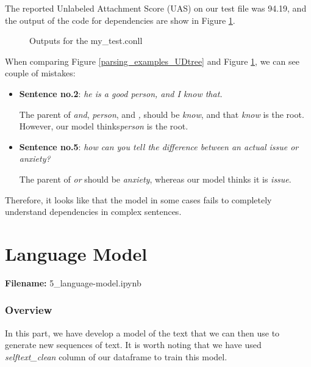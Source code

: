 \documentclass[12pt, a4paper]{article}
\begin{document}
The reported Unlabeled Attachment Score (UAS) on our test file was 94.19, and the output of the code for dependencies are show in Figure \ref{parsing_output}. 
\begin{figure}[H]
	\caption{Outputs for the my\_test.conll}
	\label{parsing_output}
\end{figure}

When comparing Figure \ref{parsing_examples_UDtree} and Figure \ref{parsing_output}, we can see couple of mistakes:
\begin{itemize}
	\item \textbf{Sentence no.2}: \emph{he is a good person, and I know that.}
	
	The parent of \emph{and}, \emph{person}, and \emph{,} should be \emph{know}, and that \emph{know} is the root. However, our model thinks\emph{person} is the root.
	
	\item \textbf{Sentence no.5}:
	 \emph{how can you tell the difference between an actual issue or anxiety?}
	 
	 The parent of \emph{or} should be \emph{anxiety}, whereas our model thinks it is \emph{issue}.
\end{itemize}
 
Therefore, it looks like that the model in some cases fails to completely understand dependencies in complex sentences. 

\newpage
\part{Language Model}
\large{\textbf{Filename:} 5\_language-model.ipynb}
\section{Overview}
In this part, we have develop a model of the text that we can then use to generate new sequences of text. It is worth noting that we have used \emph{selftext\_clean} column of our dataframe to train this model.
\end{document}
